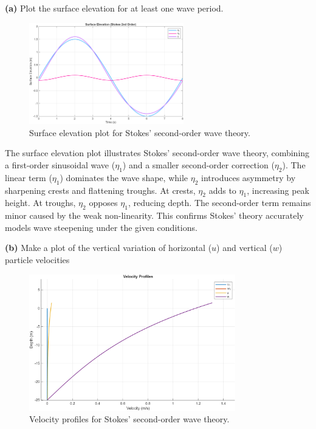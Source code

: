 \documentclass[a4paper]{article}
\begin{document}
\textbf{(a)} Plot the surface elevation for at least one wave period.
\begin{figure}[H]
    \centering
    \includegraphics[width=0.6\textwidth]{CE591HW1-Q1a.png}
    \caption{\small Surface elevation plot for Stokes' second-order wave theory.}
    \label{fig:plot2a}
\end{figure}
\vspace{0.3cm}

The surface elevation plot illustrates Stokes’ second-order wave theory, combining a first-order sinusoidal wave ($\eta_1$) and a smaller second-order correction ($\eta_2$). The linear term ($\eta_1$) dominates the wave shape, while $\eta_2$ introduces asymmetry by sharpening crests and flattening troughs. At crests, $\eta_2$ adds to $\eta_1$, increasing peak height. At troughs, $\eta_2$ opposes $\eta_1$, reducing depth. The second-order term remains minor caused by the weak non-linearity. This confirms Stokes’ theory accurately models wave steepening under the given conditions.
\vspace{0.3cm}

\textbf{(b)} Make a plot of the vertical variation of horizontal (\(u\)) and vertical (\(w\)) particle velocities
\begin{figure}[H]
    \centering
    \includegraphics[width=0.8\textwidth]{CE591HW1-Q1b.png}
    \caption{\small Velocity profiles for Stokes' second-order wave theory.}
    \label{fig:plot2b}
\end{figure}
\vspace{0.3cm}
\end{document}
